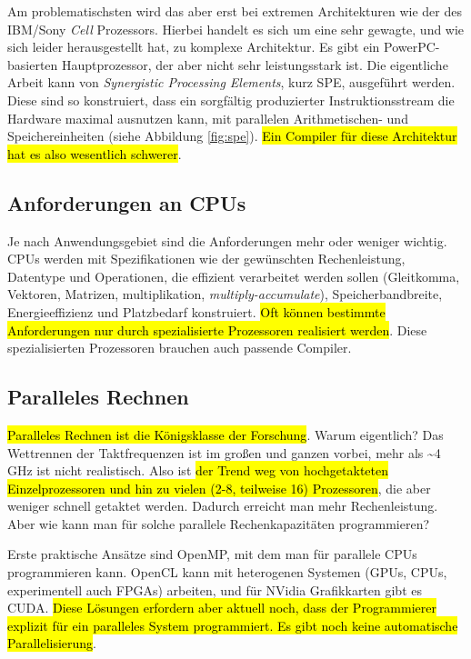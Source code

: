 \documentclass[
  ngerman,
  DIV=12
]{scrartcl}
\begin{document}
Am problematischsten wird das aber erst bei extremen Architekturen wie der des IBM/Sony \emph{Cell} Prozessors. Hierbei handelt es sich um eine sehr gewagte, und wie sich leider herausgestellt hat, zu komplexe Architektur. Es gibt ein PowerPC-basierten Hauptprozessor, der aber nicht sehr leistungsstark ist. Die eigentliche Arbeit kann von \emph{Synergistic Processing Elements}, kurz SPE, ausgeführt werden. Diese sind so konstruiert, dass ein sorgfältig produzierter Instruktionsstream die Hardware maximal ausnutzen kann, mit parallelen Arithmetischen- und Speichereinheiten (siehe Abbildung \ref{fig:spe}). \hl{Ein Compiler für diese Architektur hat es also wesentlich schwerer}.

\subsection{Anforderungen an CPUs}

Je nach Anwendungsgebiet sind die Anforderungen mehr oder weniger wichtig. CPUs werden mit Spezifikationen wie der gewünschten Rechenleistung, Datentype und Operationen, die effizient verarbeitet werden sollen (Gleitkomma, Vektoren, Matrizen, multiplikation, \emph{multiply-accumulate}), Speicherbandbreite, Energieeffizienz und Platzbedarf konstruiert. \hl{Oft können bestimmte Anforderungen nur durch spezialisierte Prozessoren realisiert werden}. Diese spezialisierten Prozessoren brauchen auch passende Compiler.

\subsection{Paralleles Rechnen}

\hl{Paralleles Rechnen ist die Königsklasse der Forschung}. Warum eigentlich? Das Wettrennen der Taktfrequenzen ist im großen und ganzen vorbei, mehr als \textasciitilde4\,GHz ist nicht realistisch. Also ist \hl{der Trend weg von hochgetakteten Einzelprozessoren und hin zu vielen (2-8, teilweise 16) Prozessoren}, die aber weniger schnell getaktet werden. Dadurch erreicht man mehr Rechenleistung. Aber wie kann man für solche parallele Rechenkapazitäten programmieren?

Erste praktische Ansätze sind OpenMP, mit dem man für parallele CPUs programmieren kann. {OpenCL} kann mit heterogenen Systemen (GPUs, CPUs, experimentell auch FPGAs) arbeiten, und für NVidia Grafikkarten gibt es CUDA. \hl{Diese Lösungen erfordern aber aktuell noch, dass der Programmierer explizit für ein paralleles System programmiert. Es gibt noch keine automatische Parallelisierung}.
\end{document}
